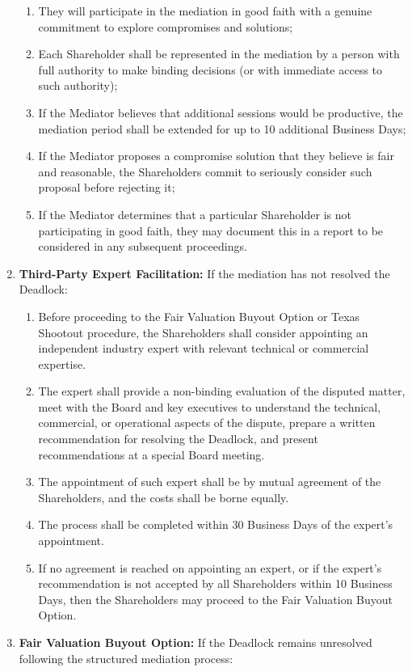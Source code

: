 \begin{enumerate}[label=(\alph*)]
\begin{enumerate}[label=(\roman*)]
        \item They will participate in the mediation in good faith with a genuine commitment to explore compromises and solutions;
        \item Each Shareholder shall be represented in the mediation by a person with full authority to make binding decisions (or with immediate access to such authority);
        \item If the Mediator believes that additional sessions would be productive, the mediation period shall be extended for up to 10 additional Business Days;
        \item If the Mediator proposes a compromise solution that they believe is fair and reasonable, the Shareholders commit to seriously consider such proposal before rejecting it;
        \item If the Mediator determines that a particular Shareholder is not participating in good faith, they may document this in a report to be considered in any subsequent proceedings.
        \end{enumerate}
    \item \textbf{Third-Party Expert Facilitation:} If the mediation has not resolved the Deadlock:
    \begin{enumerate}[label=(\roman*)]
    \item Before proceeding to the Fair Valuation Buyout Option or Texas Shootout procedure, the Shareholders shall consider appointing an independent industry expert with relevant technical or commercial expertise.
    \item The expert shall provide a non-binding evaluation of the disputed matter, meet with the Board and key executives to understand the technical, commercial, or operational aspects of the dispute, prepare a written recommendation for resolving the Deadlock, and present recommendations at a special Board meeting.
        \item The appointment of such expert shall be by mutual agreement of the Shareholders, and the costs shall be borne equally.
        \item The process shall be completed within 30 Business Days of the expert's appointment.
        \item If no agreement is reached on appointing an expert, or if the expert's recommendation is not accepted by all Shareholders within 10 Business Days, then the Shareholders may proceed to the Fair Valuation Buyout Option.
        \end{enumerate}
\item \textbf{Fair Valuation Buyout Option:} If the Deadlock remains unresolved following the structured mediation process:

\end{enumerate}
